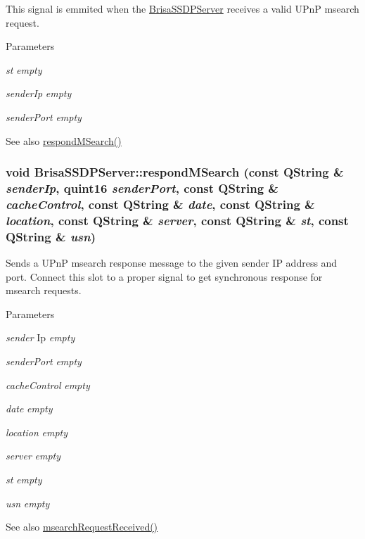 This signal is emmited when the \hyperlink{classBrisaUpnp_1_1BrisaSSDPServer}{BrisaSSDPServer} receives a valid UPnP msearch request. 
\begin{DoxyParams}{Parameters}
\item[{\em st}]{\itshape empty\/} \item[{\em senderIp}]{\itshape empty\/} \item[{\em senderPort}]{\itshape empty\/} \end{DoxyParams}
\begin{DoxySeeAlso}{See also}
\hyperlink{classBrisaUpnp_1_1BrisaSSDPServer_abd6220bed881e7e33c6e49a84388996a}{respondMSearch()} 
\end{DoxySeeAlso}
\hypertarget{classBrisaUpnp_1_1BrisaSSDPServer_abd6220bed881e7e33c6e49a84388996a}{
\subsubsection[{respondMSearch}]{\setlength{\rightskip}{0pt plus 5cm}void BrisaSSDPServer::respondMSearch (const QString \& {\em senderIp}, \/  quint16 {\em senderPort}, \/  const QString \& {\em cacheControl}, \/  const QString \& {\em date}, \/  const QString \& {\em location}, \/  const QString \& {\em server}, \/  const QString \& {\em st}, \/  const QString \& {\em usn})}}
\label{classBrisaUpnp_1_1BrisaSSDPServer_abd6220bed881e7e33c6e49a84388996a}


Sends a UPnP msearch response message to the given sender IP address and port. Connect this slot to a proper signal to get synchronous response for msearch requests.


\begin{DoxyParams}{Parameters}
\item[{\em sender}]Ip {\itshape empty\/} \item[{\em senderPort}]{\itshape empty\/} \item[{\em cacheControl}]{\itshape empty\/} \item[{\em date}]{\itshape empty\/} \item[{\em location}]{\itshape empty\/} \item[{\em server}]{\itshape empty\/} \item[{\em st}]{\itshape empty\/} \item[{\em usn}]{\itshape empty\/} \end{DoxyParams}
\begin{DoxySeeAlso}{See also}
\hyperlink{classBrisaUpnp_1_1BrisaSSDPServer_a81aff8b072c5fe63f1b3011c5084866a}{msearchRequestReceived()} 
\end{DoxySeeAlso}


